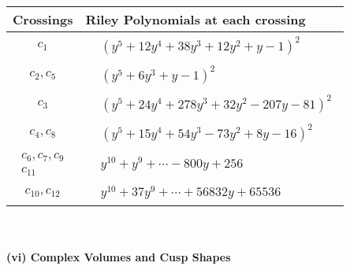 \documentclass[1p]{elsarticle_modified}
\theoremstyle{definition}
\begin{document}
\begin{tabular}{m{50pt}|m{274pt}}
Crossings & \hspace{64pt}Riley Polynomials at each crossing \\
\hline $$\begin{aligned}c_{1}\end{aligned}$$&$\begin{aligned}
&(y^5+12 y^4+38 y^3+12 y^2+y-1)^2
\end{aligned}$\\
\hline $$\begin{aligned}c_{2},c_{5}\end{aligned}$$&$\begin{aligned}
&(y^5+6 y^3+y-1)^2
\end{aligned}$\\
\hline $$\begin{aligned}c_{3}\end{aligned}$$&$\begin{aligned}
&(y^5+24 y^4+278 y^3+32 y^2-207 y-81)^2
\end{aligned}$\\
\hline $$\begin{aligned}c_{4},c_{8}\end{aligned}$$&$\begin{aligned}
&(y^5+15 y^4+54 y^3-73 y^2+8 y-16)^2
\end{aligned}$\\
\hline $$\begin{aligned}c_{6},c_{7},c_{9}\\c_{11}\end{aligned}$$&$\begin{aligned}
&y^{10}+y^9+\cdots-800 y+256
\end{aligned}$\\
\hline $$\begin{aligned}c_{10},c_{12}\end{aligned}$$&$\begin{aligned}
&y^{10}+37 y^9+\cdots+56832 y+65536
\end{aligned}$\\
\hline
\end{tabular}\\~\\
\newpage\flushleft \textbf{(vi) Complex Volumes and Cusp Shapes}
\end{document}
